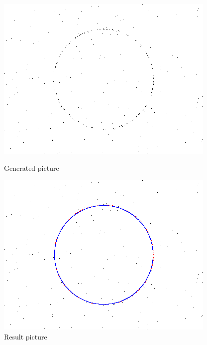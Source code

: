 \begin{figure}[htb]
	\centering
	\begin{minipage}[t]{0.49\linewidth}
		\centering
			\includegraphics[width=.90\linewidth]{images/circle-test}
		\caption{Generated picture}
	\end{minipage}
	\hfill
	\begin{minipage}[t]{0.49\linewidth}
		\centering
		\includegraphics[width=.90\linewidth]{images/circle_result}
		\caption{Result picture}
	\end{minipage}
\end{figure}



